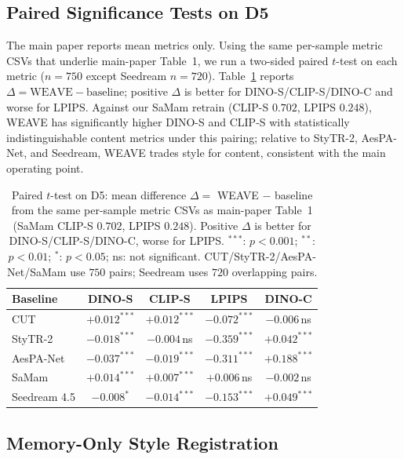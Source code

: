 \documentclass[letterpaper]{article}
\begin{document}
\subsection{Paired Significance Tests on D5}
\label{sec:supp-sig}

The main paper reports mean metrics only. Using the same per-sample metric CSVs that
underlie main-paper Table~1, we run a two-sided paired $t$-test on each metric
($n{=}750$ except Seedream $n{=}720$). Table~\ref{tab:supp-sig} reports
$\Delta=\text{WEAVE}-\text{baseline}$; positive $\Delta$ is better for DINO-S/CLIP-S/DINO-C
and worse for LPIPS. Against our SaMam retrain (CLIP-S $0.702$, LPIPS $0.248$), WEAVE has
significantly higher DINO-S and CLIP-S with statistically indistinguishable content metrics
under this pairing; relative to StyTR-2, AesPA-Net, and Seedream, WEAVE trades style for
content, consistent with the main operating point.

\begin{table}[t]
\centering
\small
\renewcommand{\arraystretch}{0.95}
\setlength{\tabcolsep}{3pt}
\begin{tabular}{@{}lcccc@{}}
\toprule
Baseline & DINO-S & CLIP-S & LPIPS & DINO-C \\
\midrule
CUT        & $+0.012^{***}$ & $+0.012^{***}$ & $-0.072^{***}$ & $-0.006$\,ns \\
StyTR-2    & $-0.018^{***}$ & $-0.004$\,ns   & $-0.359^{***}$ & $+0.042^{***}$ \\
AesPA-Net  & $-0.037^{***}$ & $-0.019^{***}$ & $-0.311^{***}$ & $+0.188^{***}$ \\
SaMam      & $+0.014^{***}$ & $+0.007^{***}$ & $+0.006$\,ns   & $-0.002$\,ns \\
Seedream 4.5 & $-0.008^{*}$ & $-0.014^{***}$ & $-0.153^{***}$ & $+0.049^{***}$ \\
\bottomrule
\end{tabular}
\caption{Paired $t$-test on D5: mean difference $\Delta=$ WEAVE $-$ baseline from the
same per-sample metric CSVs as main-paper Table~1 (SaMam CLIP-S $0.702$, LPIPS $0.248$).
Positive $\Delta$ is better for DINO-S/CLIP-S/DINO-C, worse for LPIPS.
$^{***}$: $p<0.001$; $^{**}$: $p<0.01$; $^{*}$: $p<0.05$; ns: not significant.
CUT/StyTR-2/AesPA-Net/SaMam use $750$ pairs; Seedream uses $720$ overlapping pairs.}
\label{tab:supp-sig}
\end{table}

\subsection{Memory-Only Style Registration}
\label{sec:supp-register}
\end{document}
